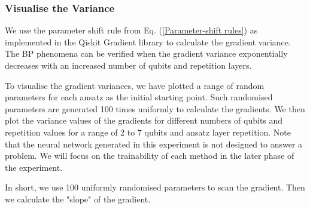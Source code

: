 \subsubsection{Visualise the Variance} \label{Sec: Visualise the Variance}
We use the parameter shift rule from Eq. (\ref{Parameter-shift rules}) as implemented in the Qiskit Gradient library to calculate the gradient variance.
The BP phenomena can be verified when the gradient variance exponentially decreases with an increased number of qubits and repetition layers.

To visualise the gradient variances, we have plotted a range of random parameters for each ansatz as the initial starting point.
Such randomised parameters are generated 100 times uniformly to calculate the gradients.
We then plot the variance values of the gradients for different numbers of qubits and repetition values for a range of 2 to 7 qubits and ansatz layer repetition.
Note that the neural network generated in this experiment is not designed to answer a problem.
We will focus on the trainability of each method in the later phase of the experiment.

In short, we use 100 uniformly randomised parameters to scan the gradient.
Then we calculate the "slope" of the gradient.